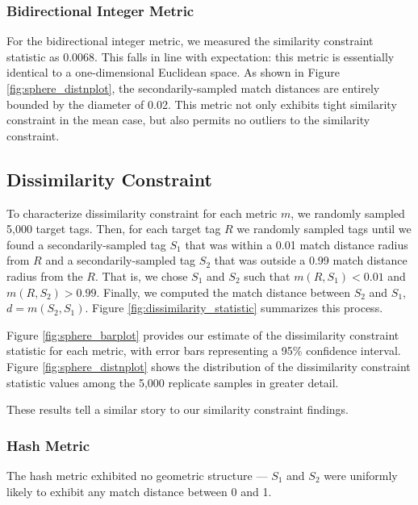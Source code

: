 \subsubsection{Bidirectional Integer Metric}

For the bidirectional integer metric, we measured the similarity constraint statistic as 0.0068.
This falls in line with expectation: this metric is essentially identical to a one-dimensional Euclidean space.
As shown in Figure \ref{fig:sphere_distnplot}, the secondarily-sampled match distances are entirely bounded by the diameter of 0.02.
This metric not only exhibits tight similarity constraint in the mean case, but also permits no outliers to the similarity constraint.

\subsection{Dissimilarity Constraint} \label{sec:dissimilarityconstraint}


% 

To characterize dissimilarity constraint for each metric $m$, we randomly sampled 5,000 target tags.
Then, for each target tag $R$ we randomly sampled tags until we found a secondarily-sampled tag $S_1$ that was within a 0.01 match distance radius from $R$ and a secondarily-sampled tag $S_2$ that was outside a 0.99 match distance radius from the $R$.
That is, we chose $S_1$ and $S_2$ such that $m(R, S_1) < 0.01$ and $m(R, S_2) > 0.99$.
Finally, we computed the match distance between $S_2$ and $S_1$, $d = m(S_2, S_1)$.
Figure \ref{fig:dissimilarity_statistic} summarizes this process.

Figure \ref{fig:sphere_barplot} provides our estimate of the dissimilarity constraint statistic for each metric, with error bars representing a 95\% confidence interval.
Figure \ref{fig:sphere_distnplot} shows the distribution of the dissimilarity constraint statistic values among the 5,000 replicate samples in greater detail.

These results tell a similar story to our similarity constraint findings.

\subsubsection{Hash Metric}
The hash metric exhibited no geometric structure --- $S_1$ and $S_2$ were uniformly likely to exhibit any match distance between 0 and 1.

